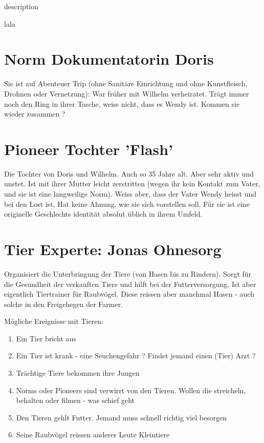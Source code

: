 \begin{npcBox}[title=Wendy]
    \begin{consequences}
    \item {}
    \item {}
    \item {}
    \end{consequences}

    \begin{npcDescription}
    description
    \end{npcDescription}


    \begin{equipment}
    \item lala
    \end{equipment}
\end{npcBox}
\newpage

\section{Norm Dokumentatorin Doris}
Sie ist auf Abenteuer Trip (ohne Sanitäre Einrichtung und ohne Kunstfleisch, Drohnen oder Vernetzung): War früher mit Wilhelm verheiratet. Trägt immer noch den Ring in ihrer Tasche, weiss nicht, dass es Wendy ist. Kommen sie wieder zusammen ?

\section{Pioneer Tochter 'Flash'}
Die Tochter von Doris und Wilhelm. Auch so 35 Jahre alt. Aber sehr aktiv und unstet. Ist mit ihrer Mutter leicht zerstritten (wegen ihr kein Kontakt zum Vater, und sie ist eine langweilige Norm). Weiss aber, dass der Vater Wendy heisst und bei den Lost ist, Hat keine Ahnung, wie sie sich vorstellen soll. Für sie ist eine originelle Geschlechts identität absolut üblich in ihrem Umfeld.

\section{Tier Experte: Jonas Ohnesorg}

Organisiert die Unterbringung der Tiere (von Hasen bis zu Rindern). Sorgt für die Gesundheit der verkauften Tiere und hilft bei der Futterversorgung. Ist aber eigentlich Tiertrainer für Raubvögel. Diese reissen aber manchmal Hasen - auch solche in den Freigehegen der Farmer.

Mögliche Ereignisse mit Tieren:

\begin{enumerate}
\item Ein Tier bricht aus
\item Ein Tier ist krank - eine Seuchengefahr ? Findet jemand einen (Tier) Arzt ?
\item Trächtige Tiere bekommen ihre Jungen
\item Norms oder Pioneers sind verwirrt von den Tieren. Wollen die streicheln, behalten oder filmen - was schief geht
\item Den Tieren gehlt Futter. Jemand muss schnell richtig viel besorgen
\item Seine Raubvögel reissen anderer Leute Kleintiere
\end{enumerate}


